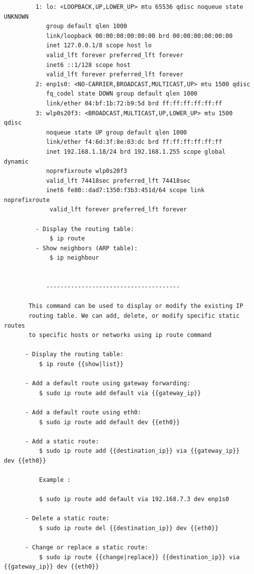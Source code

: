 \documentclass[a4paper,12pt]{article}
\begin{document}
\begin{verbatim}
         1: lo: <LOOPBACK,UP,LOWER_UP> mtu 65536 qdisc noqueue state UNKNOWN           
            group default qlen 1000
            link/loopback 00:00:00:00:00:00 brd 00:00:00:00:00:00
            inet 127.0.0.1/8 scope host lo
            valid_lft forever preferred_lft forever
            inet6 ::1/128 scope host 
            valid_lft forever preferred_lft forever
         2: enp1s0: <NO-CARRIER,BROADCAST,MULTICAST,UP> mtu 1500 qdisc 
            fq_codel state DOWN group default qlen 1000
            link/ether 04:bf:1b:72:b9:5d brd ff:ff:ff:ff:ff:ff
         3: wlp0s20f3: <BROADCAST,MULTICAST,UP,LOWER_UP> mtu 1500 qdisc 
            noqueue state UP group default qlen 1000
            link/ether f4:6d:3f:8e:03:dc brd ff:ff:ff:ff:ff:ff
            inet 192.168.1.18/24 brd 192.168.1.255 scope global dynamic 
            noprefixroute wlp0s20f3
            valid_lft 74418sec preferred_lft 74418sec
            inet6 fe80::dad7:1350:f3b3:451d/64 scope link noprefixroute 
             valid_lft forever preferred_lft forever

         - Display the routing table:
             $ ip route
         - Show neighbors (ARP table):
             $ ip neighbour


            --------------------------------------
       
       This command can be used to display or modify the existing IP 
       routing table. We can add, delete, or modify specific static routes
       to specific hosts or networks using ip route command

      - Display the routing table:
          $ ip route {{show|list}}

      - Add a default route using gateway forwarding:
          $ sudo ip route add default via {{gateway_ip}}

      - Add a default route using eth0:
          $ sudo ip route add default dev {{eth0}}

      - Add a static route:
          $ sudo ip route add {{destination_ip}} via {{gateway_ip}} dev {{eth0}}

          Example : 
          
          $ sudo ip route add default via 192.168.7.3 dev enp1s0

      - Delete a static route:
          $ sudo ip route del {{destination_ip}} dev {{eth0}}

      - Change or replace a static route:
          $ sudo ip route {{change|replace}} {{destination_ip}} via {{gateway_ip}} dev {{eth0}}
          

\end{verbatim}
\end{document}
